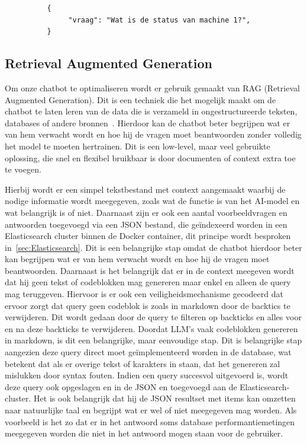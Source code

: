 \begin{listing}[H]
     \begin{verbatim}
          {
               "vraag": "Wat is de status van machine 1?",
          }
     \end{verbatim}
     \caption[Voorbeeld JSON vraag]{\label{fig:userQuestion}Voorbeeld van vraag in JSON.}
\end{listing}

\subsection{Retrieval Augmented Generation}
Om onze chatbot te optimaliseren wordt er gebruik gemaakt van RAG (Retrieval Augmented Generation).\@
Dit is een techniek die het mogelijk maakt om de chatbot te laten leren van de data die is verzameld in ongestructureerde teksten, databases of andere bronnen~\autocite{Zeichick2023}.
Hierdoor kan de chatbot beter begrijpen wat er van hem verwacht wordt en hoe hij de vragen moet beantwoorden zonder volledig het model te moeten hertrainen.
Dit is een low-level, maar veel gebruikte oplossing, die snel en flexibel bruikbaar is door documenten of context extra toe te voegen.

Hierbij wordt er een simpel tekstbestand met context aangemaakt waarbij de nodige informatie wordt meegegeven, zoals wat de functie is van het AI-model en wat belangrijk is of niet.
Daarnaast zijn er ook een aantal voorbeeldvragen en antwoorden toegevoegd via een JSON bestand, die geïndexeerd worden in een Elasticsearch cluster binnen de Docker container, dit principe wordt besproken in~\ref{sec:Elasticsearch}.
Dit is een belangrijke stap omdat de chatbot hierdoor beter kan begrijpen wat er van hem verwacht wordt en hoe hij de vragen moet beantwoorden.
Daarnaast is het belangrijk dat er in de context meegeven wordt dat hij geen tekst of codeblokken mag genereren maar enkel en alleen de query mag teruggeven.
Hiervoor is er ook een veiligheidsmechanisme gecodeerd dat ervoor zorgt dat query geen codeblok is zoals in markdown door de backtics te verwijderen.
Dit wordt gedaan door de query te filteren op backticks en alles voor en na deze backticks te verwijderen. Doordat LLM's vaak codeblokken genereren in markdown, is dit een belangrijke, maar eenvoudige stap.
Dit is belangrijke stap aangezien deze query direct moet geïmplementeerd worden in de database, wat betekent dat als er overige tekst of karakters in staan, dat het genereren zal mislukken door syntax fouten.
Indien een query succesvol uitgevoerd is, wordt deze query ook opgeslagen en in de JSON en toegevoegd aan de Elasticsearch-cluster.
Het is ook belangrijk dat hij de JSON resultset met items kan omzetten naar natuurlijke taal en begrijpt wat er wel of niet meegegeven mag worden.
Als voorbeeld is het zo dat er in het antwoord soms database performantiemetingen meegegeven worden die niet in het antwoord mogen staan voor de gebruiker.

